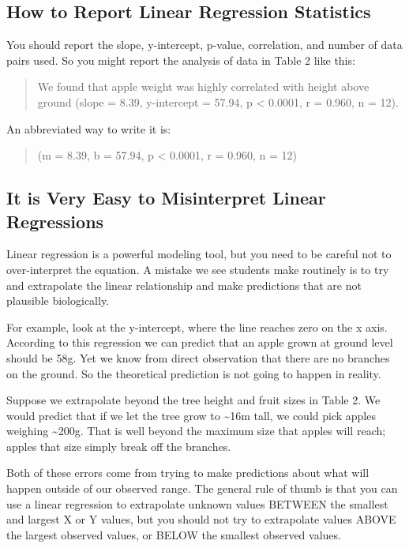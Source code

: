 \documentclass[
]{book}
\begin{document}
\hypertarget{how-to-report-linear-regression-statistics}{%
\subsection{How to Report Linear Regression Statistics}\label{how-to-report-linear-regression-statistics}}

You should report the slope, y-intercept, p-value, correlation, and number of data pairs used. So you might report the analysis of data in Table 2 like this:

\begin{quote}
We found that apple weight was highly correlated with height above ground (slope = 8.39, y-intercept = 57.94, p \textless{} 0.0001, r = 0.960, n = 12).
\end{quote}

An abbreviated way to write it is:

\begin{quote}
(m = 8.39, b = 57.94, p \textless{} 0.0001, r = 0.960, n = 12)
\end{quote}

\hypertarget{it-is-very-easy-to-misinterpret-linear-regressions}{%
\subsection{It is Very Easy to Misinterpret Linear Regressions}\label{it-is-very-easy-to-misinterpret-linear-regressions}}

Linear regression is a powerful modeling tool, but you need to be careful not to over-interpret the equation. A mistake we see students make routinely is to try and extrapolate the linear relationship and make predictions that are not plausible biologically.

For example, look at the y-intercept, where the line reaches zero on the x axis. According to this regression we can predict that an apple grown at ground level should be 58g. Yet we know from direct observation that there are no branches on the ground. So the theoretical prediction is not going to happen in reality.

Suppose we extrapolate beyond the tree height and fruit sizes in Table 2. We would predict that if we let the tree grow to \textasciitilde16m tall, we could pick apples weighing \textasciitilde200g. That is well beyond the maximum size that apples will reach; apples that size simply break off the branches.

Both of these errors come from trying to make predictions about what will happen outside of our observed range. The general rule of thumb is that you can use a linear regression to extrapolate unknown values BETWEEN the smallest and largest X or Y values, but you should not try to extrapolate values ABOVE the largest observed values, or BELOW the smallest observed values.
\end{document}
